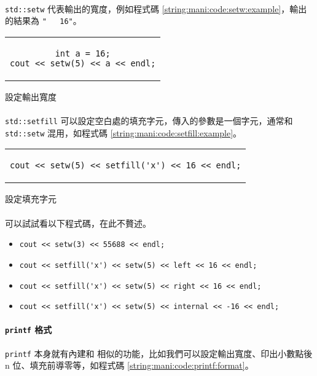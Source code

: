 \documentclass[12pt,a4paper,oneside]{report}
\begin{document}
\begin{CJK}{UTF8}{bkai}
\paragraph{}\lstinline!std::setw! 代表輸出的寬度，例如程式碼 \ref{string:mani:code:setw:example}，輸出的結果為 \lstinline!"   16"!。

\begin{code}[h!]
  \centering
  \begin{tabular}{c}
  \begin{lstlisting}
int a = 16;
cout << setw(5) << a << endl;
  \end{lstlisting}
  \end{tabular}
  \caption{設定輸出寬度}
  \label{string:mani:code:setw:example}
\end{code}

\paragraph{}\lstinline!std::setfill! 可以設定空白處的填充字元，傳入的參數是一個字元，通常和 \lstinline!std::setw! 混用，如程式碼 \ref{string:mani:code:setfill:example}。

\begin{code}[h!]
  \centering
  \begin{tabular}{c}
  \begin{lstlisting}
cout << setw(5) << setfill('x') << 16 << endl;
  \end{lstlisting}
  \end{tabular}
  \caption{設定填充字元}
  \label{string:mani:code:setfill:example}
\end{code}

\paragraph{}可以試試看以下程式碼，在此不贅述。
\begin{itemize}
\item \lstinline!cout << setw(3) << 55688 << endl;!
\item \lstinline!cout << setfill('x') << setw(5) << left << 16 << endl;!
\item \lstinline!cout << setfill('x') << setw(5) << right << 16 << endl;!
\item \lstinline!cout << setfill('x') << setw(5) << internal << -16 << endl;!
\end{itemize}

\paragraph{\lstinline!printf! 格式}\lstinline!printf! 本身就有內建和  相似的功能，比如我們可以設定輸出寬度、印出小數點後 n 位、填充前導零等，如程式碼 \ref{string:mani:code:printf:format}。


\end{CJK}
\end{document}
